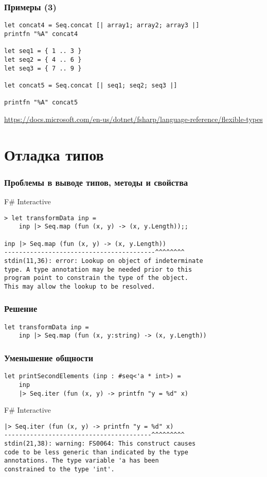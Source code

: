 \documentclass[xetex,mathserif,serif]{beamer}
\newcommand{\attribution}[1] {
    \begin{flushright}\begin{scriptsize}\textcolor{gray}{#1}\end{scriptsize}\end{flushright}
}
\begin{document}
    \begin{frame}[fragile]
        \frametitle{Примеры (3)}
        \begin{verbatim}
let concat4 = Seq.concat [| array1; array2; array3 |]
printfn "%A" concat4

let seq1 = { 1 .. 3 }
let seq2 = { 4 .. 6 }
let seq3 = { 7 .. 9 }

let concat5 = Seq.concat [| seq1; seq2; seq3 |]

printfn "%A" concat5
        \end{verbatim}
        \attribution{\url{https://docs.microsoft.com/en-us/dotnet/fsharp/language-reference/flexible-types}}
    \end{frame}

    \section{Отладка типов}

    \begin{frame}[fragile]
        \frametitle{Проблемы в выводе типов, методы и свойства}
        \begin{alertblock}{F\# Interactive}
            \begin{verbatim}
> let transformData inp =
    inp |> Seq.map (fun (x, y) -> (x, y.Length));;

inp |> Seq.map (fun (x, y) -> (x, y.Length))
-----------------------------------------^^^^^^^^
stdin(11,36): error: Lookup on object of indeterminate 
type. A type annotation may be needed prior to this 
program point to constrain the type of the object. 
This may allow the lookup to be resolved.
            \end{verbatim}
        \end{alertblock}
    \end{frame}

    \begin{frame}[fragile]
        \frametitle{Решение}
        \begin{verbatim}
let transformData inp =
    inp |> Seq.map (fun (x, y:string) -> (x, y.Length))
        \end{verbatim}
    \end{frame}

    \begin{frame}[fragile]
        \frametitle{Уменьшение общности}
        \begin{verbatim}
let printSecondElements (inp : #seq<'a * int>) =
    inp
    |> Seq.iter (fun (x, y) -> printfn "y = %d" x)
        \end{verbatim}

        \begin{alertblock}{F\# Interactive}
            \begin{verbatim}
|> Seq.iter (fun (x, y) -> printfn "y = %d" x)
----------------------------------------^^^^^^^^^
stdin(21,38): warning: FS0064: This construct causes 
code to be less generic than indicated by the type 
annotations. The type variable 'a has been 
constrained to the type 'int'.
            \end{verbatim}
        \end{alertblock}
    \end{frame}
\end{document}
